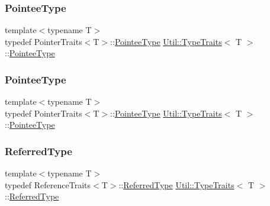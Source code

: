 \subsubsection{\texorpdfstring{PointeeType}{PointeeType}\hspace{0.1cm}{\footnotesize\ttfamily [2/3]}}
{\footnotesize\ttfamily template$<$typename T$>$ \\
typedef Pointer\+Traits$<$T$>$\+::\mbox{\hyperlink{classUtil_1_1TypeTraits_aa964d0cd9ee331e0d2d814a33bb93614}{Pointee\+Type}} \mbox{\hyperlink{classUtil_1_1TypeTraits}{Util\+::\+Type\+Traits}}$<$ T $>$\+::\mbox{\hyperlink{classUtil_1_1TypeTraits_aa964d0cd9ee331e0d2d814a33bb93614}{Pointee\+Type}}}

\mbox{\label{classUtil_1_1TypeTraits_aa964d0cd9ee331e0d2d814a33bb93614}} 
\subsubsection{\texorpdfstring{PointeeType}{PointeeType}\hspace{0.1cm}{\footnotesize\ttfamily [3/3]}}
{\footnotesize\ttfamily template$<$typename T$>$ \\
typedef Pointer\+Traits$<$T$>$\+::\mbox{\hyperlink{classUtil_1_1TypeTraits_aa964d0cd9ee331e0d2d814a33bb93614}{Pointee\+Type}} \mbox{\hyperlink{classUtil_1_1TypeTraits}{Util\+::\+Type\+Traits}}$<$ T $>$\+::\mbox{\hyperlink{classUtil_1_1TypeTraits_aa964d0cd9ee331e0d2d814a33bb93614}{Pointee\+Type}}}

\mbox{\label{classUtil_1_1TypeTraits_a89aec1a9db97b7f70e59b6738c5df4f9}} 
\subsubsection{\texorpdfstring{ReferredType}{ReferredType}\hspace{0.1cm}{\footnotesize\ttfamily [1/3]}}
{\footnotesize\ttfamily template$<$typename T$>$ \\
typedef Reference\+Traits$<$T$>$\+::\mbox{\hyperlink{classUtil_1_1TypeTraits_a89aec1a9db97b7f70e59b6738c5df4f9}{Referred\+Type}} \mbox{\hyperlink{classUtil_1_1TypeTraits}{Util\+::\+Type\+Traits}}$<$ T $>$\+::\mbox{\hyperlink{classUtil_1_1TypeTraits_a89aec1a9db97b7f70e59b6738c5df4f9}{Referred\+Type}}}


